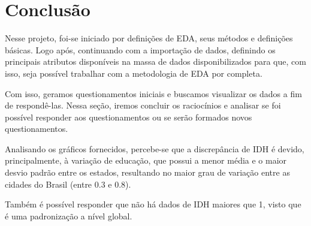 \chapter{Conclusão}

Nesse projeto, foi-se iniciado por definições de EDA, seus métodos e definições básicas. Logo após, continuando com a importação de dados, definindo os principais atributos disponíveis na massa de dados disponibilizados para que, com isso, seja possível trabalhar com a metodologia de EDA por completa.

Com isso, geramos questionamentos iniciais e buscamos visualizar os dados a fim de respondê-las. Nessa seção, iremos concluir os raciocínios e analisar se foi possível responder aos questionamentos ou se serão formados novos questionamentos.

Analisando os gráficos fornecidos, percebe-se que a discrepância de IDH é devido, principalmente, à variação de educação, que possui a menor média e o maior desvio padrão entre os estados, resultando no maior grau de variação entre as cidades do Brasil (entre 0.3 e 0.8).

Também é possível responder que não há dados de IDH maiores que 1, visto que é uma padronização a nível global.
